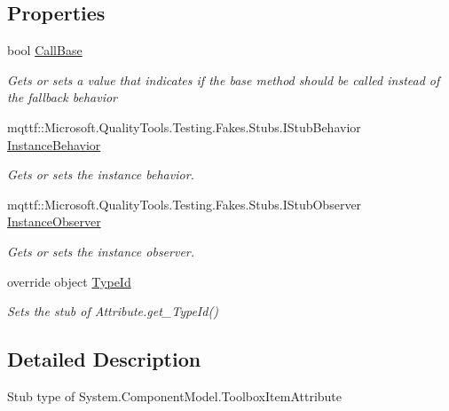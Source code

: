 \subsection*{Properties}
\begin{DoxyCompactItemize}
\item 
bool \hyperlink{class_system_1_1_component_model_1_1_fakes_1_1_stub_toolbox_item_attribute_a1d6cc0f1fa9e1741eb326214c785afa2}{Call\-Base}
\begin{DoxyCompactList}\small\item\em Gets or sets a value that indicates if the base method should be called instead of the fallback behavior\end{DoxyCompactList}\item 
mqttf\-::\-Microsoft.\-Quality\-Tools.\-Testing.\-Fakes.\-Stubs.\-I\-Stub\-Behavior \hyperlink{class_system_1_1_component_model_1_1_fakes_1_1_stub_toolbox_item_attribute_a430f0859b045b32cb28422af6f0017c5}{Instance\-Behavior}
\begin{DoxyCompactList}\small\item\em Gets or sets the instance behavior.\end{DoxyCompactList}\item 
mqttf\-::\-Microsoft.\-Quality\-Tools.\-Testing.\-Fakes.\-Stubs.\-I\-Stub\-Observer \hyperlink{class_system_1_1_component_model_1_1_fakes_1_1_stub_toolbox_item_attribute_aeb346d39469f56606d872500f7ca1a5f}{Instance\-Observer}
\begin{DoxyCompactList}\small\item\em Gets or sets the instance observer.\end{DoxyCompactList}\item 
override object \hyperlink{class_system_1_1_component_model_1_1_fakes_1_1_stub_toolbox_item_attribute_ace50a149835e6c47239d4a9aa28d9376}{Type\-Id}
\begin{DoxyCompactList}\small\item\em Sets the stub of Attribute.\-get\-\_\-\-Type\-Id()\end{DoxyCompactList}\end{DoxyCompactItemize}


\subsection{Detailed Description}
Stub type of System.\-Component\-Model.\-Toolbox\-Item\-Attribute



